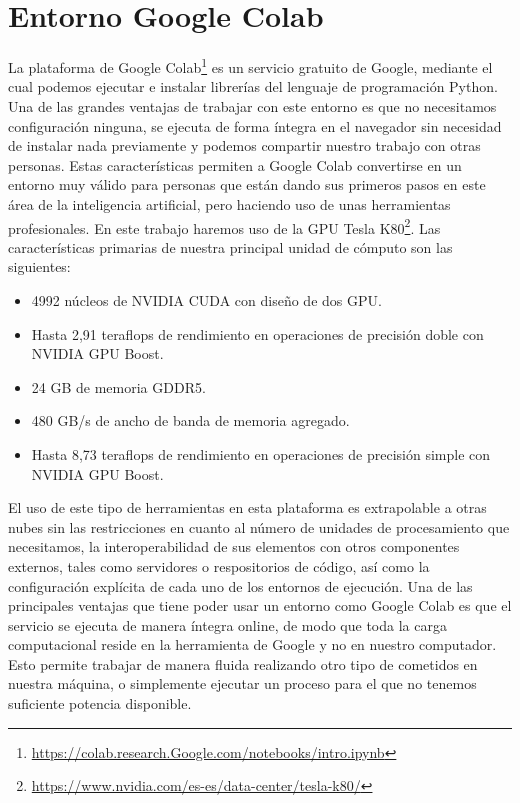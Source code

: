 \section{Entorno Google Colab}\label{sec:entorno-Google-colab}
La plataforma de Google Colab\footnote{\url{https://colab.research.Google.com/notebooks/intro.ipynb}} es un servicio gratuito de Google, mediante el cual podemos ejecutar e instalar librerías del lenguaje de programación Python\cite{python_object_oriented}.
Una de las grandes ventajas de trabajar con este entorno es que no necesitamos configuración ninguna, se ejecuta de forma íntegra en el navegador sin necesidad de instalar nada previamente y podemos compartir
nuestro trabajo con otras personas.
Estas características permiten a Google Colab convertirse en un entorno muy válido para personas que están dando sus primeros pasos en este área de la inteligencia artificial, pero haciendo uso
de unas herramientas profesionales.
En este trabajo haremos uso de la GPU Tesla K80\footnote{\url{https://www.nvidia.com/es-es/data-center/tesla-k80/}}.
Las características primarias de nuestra principal unidad de cómputo son las siguientes:
\begin{itemize}
    \item 4992 núcleos de NVIDIA CUDA con diseño de dos GPU\@.
    \item Hasta 2,91 teraflops de rendimiento en operaciones de precisión doble con NVIDIA GPU Boost.
    \item 24 GB de memoria GDDR5.
    \item 480 GB/s de ancho de banda de memoria agregado.
    \item Hasta 8,73 teraflops de rendimiento en operaciones de precisión simple con NVIDIA GPU Boost.
\end{itemize}

El uso de este tipo de herramientas en esta plataforma es extrapolable a otras nubes sin las restricciones en cuanto al número de unidades de procesamiento que necesitamos, la interoperabilidad de sus elementos con otros componentes externos, tales como servidores o respositorios de código, así como la configuración explícita de cada uno de los entornos de ejecución.
Una de las principales ventajas que tiene poder usar un entorno como Google Colab es que el servicio se ejecuta de manera íntegra online, de modo que toda la carga computacional reside en la herramienta de Google y no en nuestro computador.
Esto permite trabajar de manera fluida realizando otro tipo de cometidos en nuestra máquina, o simplemente ejecutar un proceso para el que no tenemos suficiente potencia disponible.
